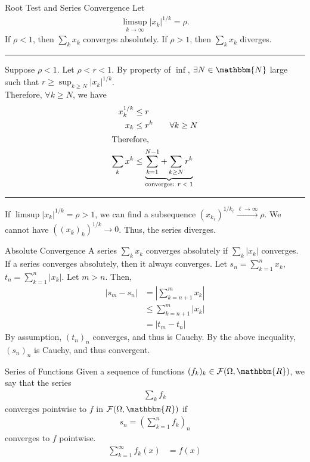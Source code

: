 \documentclass[10pt]{extarticle}
\newcommand{\N}{\mathbbm{N}}
\newcommand{\R}{\mathbbm{R}}
\begin{document}
  \begin{problem}{Root Test and Series Convergence}
    Let
    \begin{align*}
      \limsup_{k\rightarrow\infty}|x_k|^{1/k} = \rho.
    \end{align*}
    If $\rho < 1$, then $\sum_k x_k$ converges absolutely. If $\rho > 1$, then $\sum_k x_k$ diverges.\\
    \vspace{4pt}
    \rule{\textwidth}{0.4pt}
    \vspace{4pt}
    Suppose $\rho < 1$. Let $\rho < r < 1$. By property of $\inf$, $\exists N\in \N$ large such that $r \geq \sup_{k\geq N}|x_k|^{1/k}$.\\

    Therefore, $\forall k\geq N$, we have
    \begin{align*}
      x_k^{1/k} &\leq r\\
      x_k &\leq r^k \tag*{$\forall k \geq N$}\\
      \shortintertext{Therefore,}
      \sum_k x^k &\leq \underbrace{\sum_{k=1}^{N-1} + \sum_{k\geq N}r^k}_{\text{converges: $r < 1$}}
    \end{align*}
    \vspace{4pt}
    \rule{\textwidth}{0.4pt}
    \vspace{4pt}
    If $\limsup |x_k|^{1/k} = \rho > 1$, we can find a subsequence $\left(x_{k_\ell}\right)^{1/{k_\ell}} \xrightarrow{\ell\rightarrow\infty} \rho$. We cannot have $\left((x_k)_k\right)^{1/k} \rightarrow 0$. Thus, the series diverges.
  \end{problem}
  \begin{problem}{Absolute Convergence}
    A series $\sum_k x_k$ converges absolutely if $\sum_k |x_k|$ converges. If a series converges absolutely, then it always converges.
    \tcblower
    Let $s_n = \sum_{k=1}^{n}x_k$, $t_n = \sum_{k=1}^{n}|x_k|$. Let $m > n$. Then,
    \begin{align*}
      \left|s_m - s_n\right| &= \left|\sum_{k=n+1}^{m}x_k\right|\\
                             &\leq \sum_{k=n+1}^{m}|x_k|\tag*{Triangle Inequality}\\
                             &= |t_m - t_n|
    \end{align*}
    By assumption, $(t_n)_n$ converges, and thus is Cauchy. By the above inequality, $(s_n)_n$ is Cauchy, and thus convergent.
  \end{problem}
  \begin{problem}{Series of Functions}
    Given a sequence of functions $(f_k)_k \in \mathcal{F}(\Omega,\R)$, we say that the series
    \begin{align*}
      \sum_{k}f_k
    \end{align*}
    converges pointwise to $f$ in $\mathcal{F}(\Omega,\R)$ if
    \begin{align*}
      s_n = \left(\sum_{k=1}^{n}f_k\right)_n
    \end{align*}
    converges to $f$ pointwise.
    \begin{align*}
      \sum_{k=1}^{\infty}f_k(x) &= f(x) \tag*{$\forall x\in\Omega$}
    \end{align*}
  \end{problem}
\end{document}
